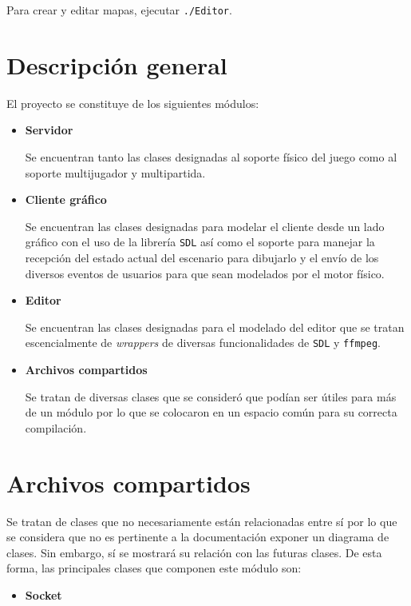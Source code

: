 \documentclass[a4paper]{article}
\begin{document}
Para crear y editar mapas, ejecutar \texttt{./Editor}.

\section{Descripción general}

El proyecto se constituye de los siguientes módulos:

\begin{itemize}
	\item \textbf{Servidor}

Se encuentran tanto las clases designadas al soporte físico del juego como al soporte multijugador y multipartida.

	\item \textbf{Cliente gráfico}
	
Se encuentran las clases designadas para modelar el cliente desde un lado gráfico con el uso de la librería \texttt{SDL} así como el soporte para manejar la recepción del estado actual del escenario para dibujarlo y el envío de los diversos eventos de usuarios para que sean modelados por el motor físico.
	\item \textbf{Editor}
	
Se encuentran las clases designadas para el modelado del editor que se tratan escencialmente de \textit{wrappers} de diversas funcionalidades de \texttt{SDL} y \texttt{ffmpeg}.

	\item \textbf{Archivos compartidos}
	
Se tratan de diversas clases que se consideró que podían ser útiles para más de un módulo por lo que se colocaron en un espacio común para su correcta compilación.
\end{itemize}

\section{Archivos compartidos}

Se tratan de clases que no necesariamente están relacionadas entre sí por lo que se considera que no es pertinente a la documentación exponer un diagrama de clases. Sin embargo, sí se mostrará su relación con las futuras clases. De esta forma, las principales clases que componen este módulo son:

\begin{itemize}
	\item \textbf{Socket}
\end{itemize}
\end{document}
